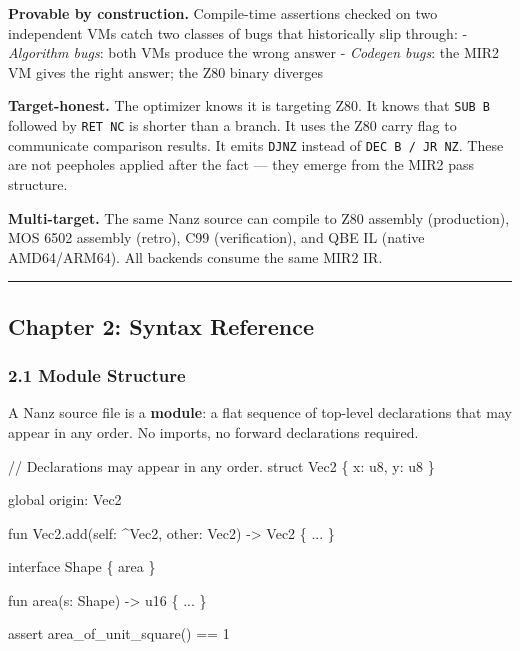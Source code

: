 \documentclass[
  11pt,
]{article}
\newenvironment{Shaded}{}{}
\newcommand{\NormalTok}[1]{#1}
\begin{document}
\textbf{Provable by construction.} Compile-time assertions checked on
two independent VMs catch two classes of bugs that historically slip
through: - \emph{Algorithm bugs}: both VMs produce the wrong answer -
\emph{Codegen bugs}: the MIR2 VM gives the right answer; the Z80 binary
diverges

\textbf{Target-honest.} The optimizer knows it is targeting Z80. It
knows that \texttt{SUB\ B} followed by \texttt{RET\ NC} is shorter than
a branch. It uses the Z80 carry flag to communicate comparison results.
It emits \texttt{DJNZ} instead of \texttt{DEC\ B\ /\ JR\ NZ}. These are
not peepholes applied after the fact --- they emerge from the MIR2 pass
structure.

\textbf{Multi-target.} The same Nanz source can compile to Z80 assembly
(production), MOS 6502 assembly (retro), C99 (verification), and QBE IL
(native AMD64/ARM64). All backends consume the same MIR2 IR.

\begin{center}\rule{0.5\linewidth}{0.5pt}\end{center}

\subsection{Chapter 2: Syntax
Reference}\label{chapter-2-syntax-reference}

\subsubsection{2.1 Module Structure}\label{module-structure}

A Nanz source file is a \textbf{module}: a flat sequence of top-level
declarations that may appear in any order. No imports, no forward
declarations required.

\begin{Shaded}
\begin{Highlighting}[]
\NormalTok{// Declarations may appear in any order.}
\NormalTok{struct Vec2 \{ x: u8, y: u8 \}}

\NormalTok{global origin: Vec2}

\NormalTok{fun Vec2.add(self: \^{}Vec2, other: Vec2) {-}\textgreater{} Vec2 \{ ... \}}

\NormalTok{interface Shape \{ area \}}

\NormalTok{fun area(s: Shape) {-}\textgreater{} u16 \{ ... \}}

\NormalTok{assert area\_of\_unit\_square() == 1}
\end{Highlighting}
\end{Shaded}
\end{document}
